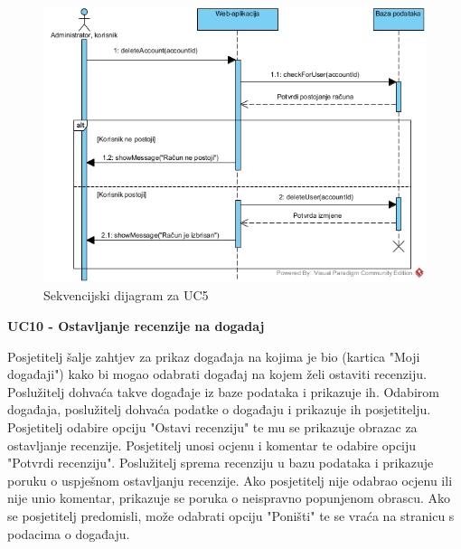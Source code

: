 				\begin{figure}[htbp]
					\centering
					\includegraphics[width=1\textwidth]{dijagrami/UC5-seq.jpg}
					\caption{Sekvencijski dijagram za UC5}
				\label{fig:my_image}
				\end{figure}
				\eject

				\noindent \textbf{UC10 - Ostavljanje recenzije na dogadaj}

				\noindent Posjetitelj šalje zahtjev za prikaz događaja na kojima je bio 
				(kartica "Moji događaji") kako bi mogao odabrati događaj na kojem
				želi ostaviti recenziju. Poslužitelj dohvaća takve događaje iz baze podataka
				i prikazuje ih. Odabirom događaja, poslužitelj dohvaća podatke o događaju
				i prikazuje ih posjetitelju. Posjetitelj odabire opciju "Ostavi recenziju"
				te mu se prikazuje obrazac za ostavljanje recenzije. Posjetitelj unosi
				ocjenu i komentar te odabire opciju "Potvrdi recenziju". Poslužitelj
				sprema recenziju u bazu podataka i prikazuje poruku o uspješnom ostavljanju
				recenzije. Ako posjetitelj nije odabrao ocjenu ili nije unio komentar,
				prikazuje se poruka o neispravno popunjenom obrascu. Ako se posjetitelj
				predomisli, može odabrati opciju "Poništi" te se vraća na stranicu s
				podacima o događaju.

